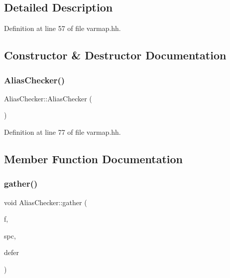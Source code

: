\subsection{Detailed Description}


Definition at line 57 of file varmap.\+hh.



\subsection{Constructor \& Destructor Documentation}
\mbox{\label{class_alias_checker_adeb4008b6f62e152a241b9f988bea4dc}} 
\subsubsection{\texorpdfstring{AliasChecker()}{AliasChecker()}}
{\footnotesize\ttfamily Alias\+Checker\+::\+Alias\+Checker (\begin{DoxyParamCaption}{ }\end{DoxyParamCaption})\hspace{0.3cm}{\ttfamily [inline]}}



Definition at line 77 of file varmap.\+hh.



\subsection{Member Function Documentation}
\mbox{\label{class_alias_checker_a66092e26df7c31f66bb375abc184a490}} 
\subsubsection{\texorpdfstring{gather()}{gather()}}
{\footnotesize\ttfamily void Alias\+Checker\+::gather (\begin{DoxyParamCaption}\item[{const \mbox{\hyperlink{class_funcdata}{Funcdata}} $\ast$}]{f,  }\item[{\mbox{\hyperlink{class_addr_space}{Addr\+Space}} $\ast$}]{spc,  }\item[{bool}]{defer }\end{DoxyParamCaption})}



